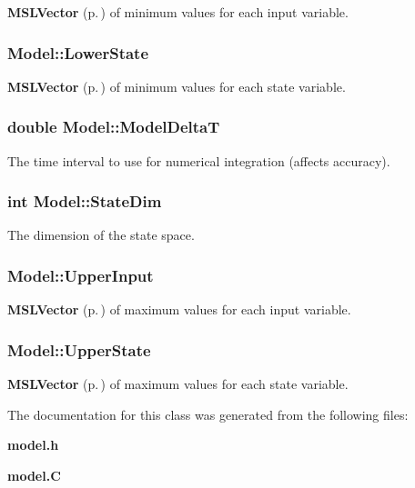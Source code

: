 {\bf MSLVector} {\rm (p.\,\pageref{classMSLVector})} of minimum values for each input variable.

\subsubsection{ Model::Lower\-State}\label{classModel_m1}


{\bf MSLVector} {\rm (p.\,\pageref{classMSLVector})} of minimum values for each state variable.

\subsubsection{\setlength{\rightskip}{0pt plus 5cm}double Model::Model\-Delta\-T\hspace{0.3cm}{\tt  [protected]}}\label{classModel_n0}


The time interval to use for numerical integration (affects accuracy).

\subsubsection{\setlength{\rightskip}{0pt plus 5cm}int Model::State\-Dim}\label{classModel_m5}


The dimension of the state space.

\subsubsection{ Model::Upper\-Input}\label{classModel_m4}


{\bf MSLVector} {\rm (p.\,\pageref{classMSLVector})} of maximum values for each input variable.

\subsubsection{ Model::Upper\-State}\label{classModel_m2}


{\bf MSLVector} {\rm (p.\,\pageref{classMSLVector})} of maximum values for each state variable.



The documentation for this class was generated from the following files:\begin{CompactItemize}
\item 
{\bf model.h}\item 
{\bf model.C}\end{CompactItemize}
